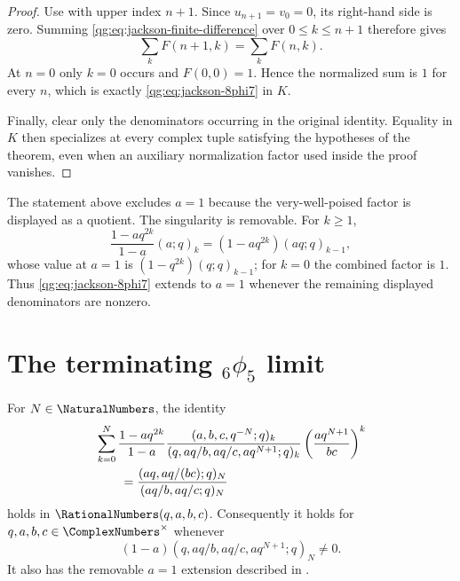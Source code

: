 \begin{proof}
Use  with upper index $n+1$.  Since
$u_{n+1}=v_0=0$, its right-hand side is zero.  Summing
\eqref{qg:eq:jackson-finite-difference} over $0\le k\le n+1$ therefore gives
\[
 \sum_kF(n+1,k)=\sum_kF(n,k).
\]
At $n=0$ only $k=0$ occurs and $F(0,0)=1$.  Hence the normalized sum is $1$
for every $n$, which is exactly \eqref{qg:eq:jackson-8phi7} in $K$.

Finally, clear only the denominators occurring in the original identity.
Equality in $K$ then specializes at every complex tuple satisfying the
hypotheses of the theorem, even when an auxiliary normalization factor used
inside the proof vanishes.
\end{proof}

\begin{remark}[The removable value $a=1$]
\label{qg:rem:jackson-a-one}
The statement above excludes $a=1$ because the very-well-poised factor is
displayed as a quotient.  The singularity is removable.  For $k\ge1$,
\[
 \frac{1-aq^{2k}}{1-a}(a;q)_k
 =(1-aq^{2k})(aq;q)_{k-1},
\]
whose value at $a=1$ is $(1-q^{2k})(q;q)_{k-1}$; for $k=0$ the combined
factor is $1$.  Thus \eqref{qg:eq:jackson-8phi7} extends to $a=1$ whenever
the remaining displayed denominators are nonzero.
\end{remark}

\section{The terminating \texorpdfstring{${}_6\phi_5$}{6phi5} limit}
\label{qg:sec:terminating-6phi5}

\begin{corollary}
\label{qg:cor-jackson-6phi5}
For $N\in\NaturalNumbers$, the identity
\begin{align}
&\sum_{k=0}^{N}
 \frac{1-aq^{2k}}{1-a}
 \frac{(a,b,c,q^{-N};q)_k}
 {(q,aq/b,aq/c,aq^{N+1};q)_k}
 \left(\frac{aq^{N+1}}{bc}\right)^k
 \notag\\
&\qquad=
 \frac{(aq,aq/(bc);q)_N}{(aq/b,aq/c;q)_N}
\label{qg:eq:terminating-6phi5}
\end{align}
holds in $\RationalNumbers(q,a,b,c)$.  Consequently it holds for
$q,a,b,c\in\ComplexNumbers^\times$ whenever
\[
 (1-a)(q,aq/b,aq/c,aq^{N+1};q)_N\ne0.
\]
It also has the removable $a=1$ extension described in
.
\end{corollary}

